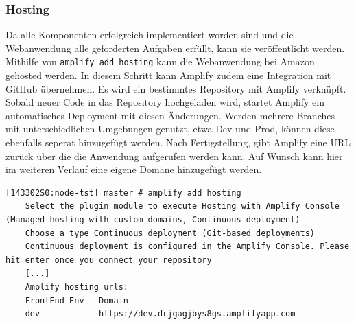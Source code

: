 \subsubsection{Hosting}

Da alle Komponenten erfolgreich implementiert worden sind und die Webanwendung alle geforderten Aufgaben erfüllt, kann sie veröffentlicht werden.
Mithilfe von \verb+amplify add hosting+ kann die Webanwendung bei Amazon gehosted werden.
In diesem Schritt kann Amplify zudem eine Integration mit GitHub übernehmen.
Es wird ein bestimmtes Repository mit Amplify verknüpft.
Sobald neuer Code in das Repository hochgeladen wird, startet Amplify ein automatisches Deployment mit diesen Änderungen.
Werden mehrere Branches mit unterschiedlichen Umgebungen genutzt, etwa Dev und Prod, können diese ebenfalls seperat hinzugefügt werden.
Nach Fertigstellung, gibt Amplify eine URL zurück über die die Anwendung aufgerufen werden kann.
Auf Wunsch kann hier im weiteren Verlauf eine eigene Domäne hinzugefügt werden.

\begin{lstlisting}[basicstyle=\ttfamily\small, breaklines=true , frame = single, backgroundcolor=\color{lavender} ]
    [143302S0:node-tst] master # amplify add hosting
    Select the plugin module to execute Hosting with Amplify Console (Managed hosting with custom domains, Continuous deployment)
    Choose a type Continuous deployment (Git-based deployments)
    Continuous deployment is configured in the Amplify Console. Please hit enter once you connect your repository
    [...]
    Amplify hosting urls:
    FrontEnd Env   Domain
    dev            https://dev.drjgagjbys8gs.amplifyapp.com

    \end{lstlisting}

